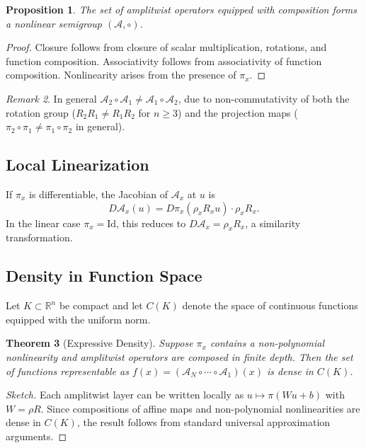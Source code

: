 \documentclass[12pt, a4paper]{article}
\newtheorem{theorem}{Theorem}[section]
\newtheorem{proposition}[theorem]{Proposition}
\theoremstyle{remark}
\newtheorem{remark}[theorem]{Remark}
\theoremstyle{definition}
\begin{document}
\begin{proposition}
The set of amplitwist operators equipped with composition forms a nonlinear semigroup
$(\mathcal{A}, \circ)$.
\end{proposition}

\begin{proof}
Closure follows from closure of scalar multiplication, rotations, and function composition.
Associativity follows from associativity of function composition.  Nonlinearity arises from
the presence of $\pi_x$.
\end{proof}

\begin{remark}
In general $\mathcal{A}_2 \circ \mathcal{A}_1 \neq \mathcal{A}_1 \circ \mathcal{A}_2$,
due to non-commutativity of both the rotation group ($R_2 R_1 \neq R_1 R_2$ for $n \ge 3$)
and the projection maps ($\pi_2 \circ \pi_1 \neq \pi_1 \circ \pi_2$ in general).
\end{remark}

\subsection{Local Linearization}

If $\pi_x$ is differentiable, the Jacobian of $\mathcal{A}_x$ at $u$ is
\[
D\mathcal{A}_x(u) = D\pi_x(\rho_x R_x u)\cdot \rho_x R_x.
\]
In the linear case $\pi_x = \mathrm{Id}$, this reduces to $D\mathcal{A}_x = \rho_x R_x$,
a similarity transformation.

\subsection{Density in Function Space}

Let $K \subset \mathbb{R}^n$ be compact and let $C(K)$ denote the space of continuous
functions equipped with the uniform norm.

\begin{theorem}[Expressive Density]
\label{thm:density}
Suppose $\pi_x$ contains a non-polynomial nonlinearity and amplitwist operators are
composed in finite depth.  Then the set of functions representable as
$f(x) = (\mathcal{A}_N \circ \cdots \circ \mathcal{A}_1)(x)$
is dense in $C(K)$.
\end{theorem}

\begin{proof}[Sketch]
Each amplitwist layer can be written locally as $u \mapsto \pi(Wu + b)$ with $W = \rho R$.
Since compositions of affine maps and non-polynomial nonlinearities are dense in $C(K)$,
the result follows from standard universal approximation arguments.
\end{proof}
\end{document}
